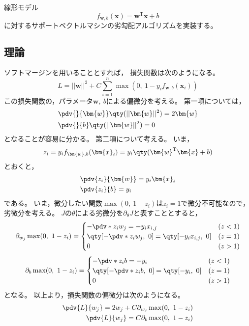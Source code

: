 \documentclass[class=jsarticle, crop=false, dvipdfmx, fleqn]{standalone}
\begin{document}
\section{}


線形モデル
\begin{equation}
    f_{\bm{w}, b} (\bm{x}) = \bm{w}^\mathrm{T} \bm{x} + b
        \label{eq:model}
\end{equation}
に対するサポートベクトルマシンの劣勾配アルゴリズムを実装する。


\subsection*{理論}

ソフトマージンを用いることとすれば，
損失関数は次のようになる。
\begin{equation}
    L = ||\bm{w}||^2 + C \sum_{i=1}^{n} \max(0,\ 1 - y_i f_{\bm{w}, b} (\bm{x}_i))
\end{equation}
この損失関数の，パラメータ\(\bm{w},\ b\)による偏微分を考える。
第一項については，
\begin{align}
    & \pdv{}{\bm{w}} \qty(||\bm{w}||^2) = 2 \bm{w} \\
    & \pdv{}{b} \qty(||\bm{w}||^2) = 0
\end{align}
となることが容易に分かる。
第二項について考える。
いま，
\begin{equation}
    z_i = y_i f_{\bm{w}, b} (\bm{x}_i) = y_i \qty(\bm{w}^\mathrm{T} \bm{x} + b)
\end{equation}
とおくと，
\begin{align}
    & \pdv{z_i}{\bm{w}} = y_i \bm{x}_i \\
    & \pdv{z_i}{b} = y_i
\end{align}
である。
いま，微分したい関数\(\max(0,\ 1-z_i)\)は\(z_i = 1\)で微分不可能なので，
劣微分を考える。
\(J\)の\(\theta\)による劣微分を\(\partial_\theta J\)と表すこととすると，
\begin{equation}
    \partial_{w_j} \max(0,\ 1-z_i) =
        \begin{cases}
            - \pdv*{z_i}{w_j} = -y_i x_{i, j} & (z < 1) \\
            \qty[- \pdv*{z_i}{w_j},\ 0] = \qty[-y_i x_{i, j},\ 0] & (z = 1) \\
            0 & (z > 1)
        \end{cases}
\end{equation}
\begin{equation}
    \partial_{b} \max(0,\ 1-z_i) =
        \begin{cases}
            - \pdv*{z_i}{b} = -y_i & (z < 1) \\
            \qty[- \pdv*{z_i}{b},\ 0] = \qty[-y_i,\ 0] & (z = 1) \\
            0 & (z > 1)
        \end{cases}
\end{equation}
となる。
以上より，損失関数の偏微分は次のようになる。
\begin{align}
    \pdv{L}{w_j} = 2 w_j + C \partial_{w_j} \max(0,\ 1-z_i) \\
    \pdv{L}{w_j} = C \partial_{b} \max(0,\ 1-z_i)
\end{align}
\end{document}
